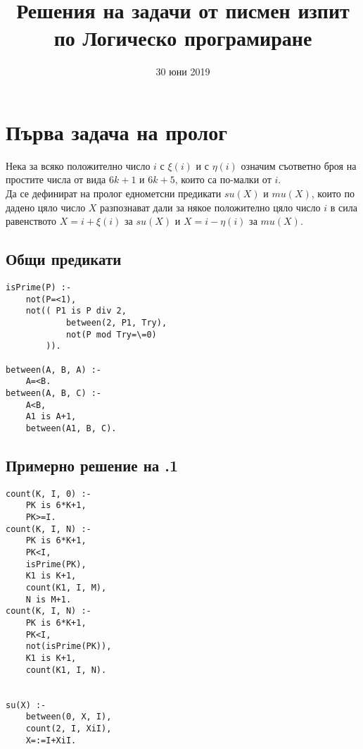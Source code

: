 \documentclass[]{article}
\title{Решения на задачи от писмен изпит по Логическо програмиране}
\date{30 юни 2019}
\newenvironment{longlisting}{\captionsetup{type=listing}}{}
\begin{document}
\maketitle %
\newpage
\tableofcontents
\newpage %
\section{Първа задача на пролог}
Нека за всяко положително число $i$ с $\xi(i)$ и с $\eta(i)$ означим съответно броя на простите числа от вида $6k+1$ и $6k+5$, които са по-малки от $i$. \\
Да се дефинират на пролог еднометсни предикати $su(X)$ и $mu(X)$, които по дадено цяло число $X$ разпознават дали за някое положително цяло число $i$ в сила равенството $X=i + \xi(i)$ за $su(X)$ и  $X=i - \eta(i)$ за  $mu(X)$.\\
\subsection{Общи предикати}
\begin{longlisting}
\begin{verbatim}
isPrime(P) :-
    not(P=<1),
    not(( P1 is P div 2,
            between(2, P1, Try),
            not(P mod Try=\=0)
        )).

between(A, B, A) :-
    A=<B.
between(A, B, C) :- 
    A<B,
    A1 is A+1,
    between(A1, B, C).
\end{verbatim}
\end{longlisting}

\vskip 0.2in

\subsection{Примерно решение на .1} 
\begin{longlisting}
    \begin{verbatim}
count(K, I, 0) :-
    PK is 6*K+1,
    PK>=I.
count(K, I, N) :-
    PK is 6*K+1,
    PK<I,
    isPrime(PK),
    K1 is K+1,
    count(K1, I, M),
    N is M+1.
count(K, I, N) :-
    PK is 6*K+1,
    PK<I,
    not(isPrime(PK)),
    K1 is K+1,
    count(K1, I, N).


su(X) :-
    between(0, X, I),
    count(2, I, XiI),
    X=:=I+XiI.
\end{verbatim}
\end{longlisting}
\end{document}
